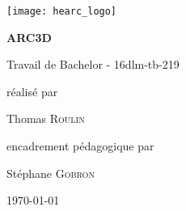 \begin{titlepage}
	\centering
	\texttt{[image: hearc\_logo]}\par
	\vspace{3cm}
	
	{\Huge\bfseries ARC3D\par}
	\vspace{0.5cm}
	{Travail de Bachelor - 16dlm-tb-219\par}
	
	\vfill
	réalisé par\par
	Thomas \textsc{Roulin}
	
	\vspace{0.5cm}
	encadrement pédagogique par\par
	Stéphane \textsc{Gobron}
	\vfill
	
	{\today\par}
\end{titlepage}